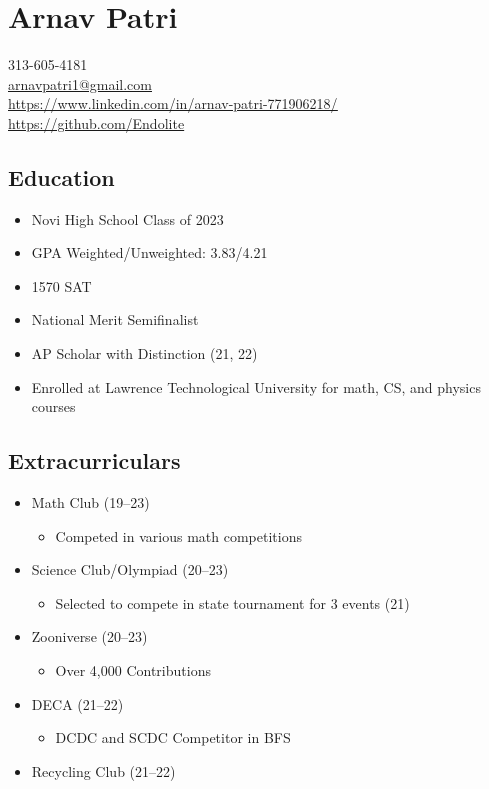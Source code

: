 \documentclass[12pt, twocolumn]{article}
\begin{document}
	{\parindent 0pt
		\section*{Arnav Patri}		
		\footnotesize
			313-605-4181 \\
			\href{mailto:arnavpatri1@gmail.com}{\underline{arnavpatri1@gmail.com}} \\
			\href{https://www.linkedin.com/in/arnav-patri-771906218/}{\underline{https://www.linkedin.com/in/arnav-patri-771906218/}}
			\href{https://github.com/Endolite}{\underline{https://github.com/Endolite}}
		\normalsize
			\subsection*{Education}
				\begin{itemize}
					\item
						Novi High School Class of 2023
					\item
						GPA Weighted/Unweighted: 3.83/4.21
					\item
						1570 SAT
					\item
						National Merit Semifinalist
					\item
						AP Scholar with Distinction (21, 22)
					\item
						Enrolled at Lawrence Technological University for math, CS, and physics courses
				\end{itemize}
			\subsection*{Extracurriculars}
				\begin{itemize}
					\item
						Math Club (19--23)
						\begin{itemize}[leftmargin = 13.5pt]
							\item
								Competed in various math competitions
						\end{itemize}
					\item
						Science Club/Olympiad (20--23)
						\begin{itemize}[leftmargin = 13.5pt]
							\item
								Selected to compete in state tournament for 3 events (21)
						\end{itemize}
					\item
						Zooniverse (20--23)
						\begin{itemize}[leftmargin = 13.5pt]
							\item
								Over 4,000 Contributions
						\end{itemize}
					\item
						DECA (21--22)
						\begin{itemize}[leftmargin = 13.5pt]
							\item
								DCDC and SCDC Competitor in BFS
						\end{itemize}
					\item
						Recycling Club (21--22)
				\end{itemize}
}
\end{document}
